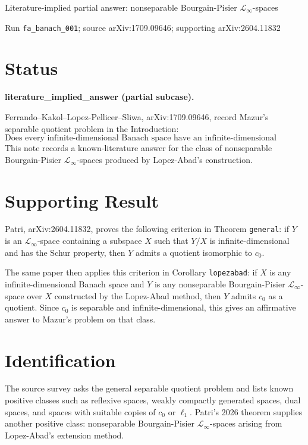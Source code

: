\documentclass[11pt]{article}
\newcommand{\linf}{\mathcal{L}_{\infty}}
\newcommand{\czero}{c_0}
\begin{document}
\begin{center}
{\Large Literature-implied partial answer: nonseparable Bourgain-Pisier
\(\linf\)-spaces}

\medskip
{\small Run \texttt{fa\_banach\_001}; source arXiv:1709.09646; supporting arXiv:2604.11832}
\end{center}

\section*{Status}

\textbf{literature\_implied\_answer (partial subcase).}

Ferrando--Kakol--Lopez-Pellicer--Sliwa, arXiv:1709.09646, record Mazur's
separable quotient problem in the Introduction:
\[
\text{Does every infinite-dimensional Banach space have an infinite-dimensional separable quotient?}
\]
This note records a known-literature answer for the class of nonseparable
Bourgain-Pisier \(\linf\)-spaces produced by Lopez-Abad's construction.

\section*{Supporting Result}

Patri, arXiv:2604.11832, proves the following criterion in Theorem
\texttt{general}: if \(Y\) is an \(\linf\)-space containing a subspace \(X\)
such that \(Y/X\) is infinite-dimensional and has the Schur property, then
\(Y\) admits a quotient isomorphic to \(\czero\).

The same paper then applies this criterion in Corollary \texttt{lopezabad}:
if \(X\) is any infinite-dimensional Banach space and \(Y\) is any
nonseparable Bourgain-Pisier \(\linf\)-space over \(X\) constructed by the
Lopez-Abad method, then \(Y\) admits \(\czero\) as a quotient. Since
\(\czero\) is separable and infinite-dimensional, this gives an affirmative
answer to Mazur's problem on that class.

\section*{Identification}

The source survey asks the general separable quotient problem and lists
known positive classes such as reflexive spaces, weakly compactly generated
spaces, dual spaces, and spaces with suitable copies of \(c_0\) or \(\ell_1\).
Patri's 2026 theorem supplies another positive class: nonseparable
Bourgain-Pisier \(\linf\)-spaces arising from Lopez-Abad's extension method.
\end{document}
